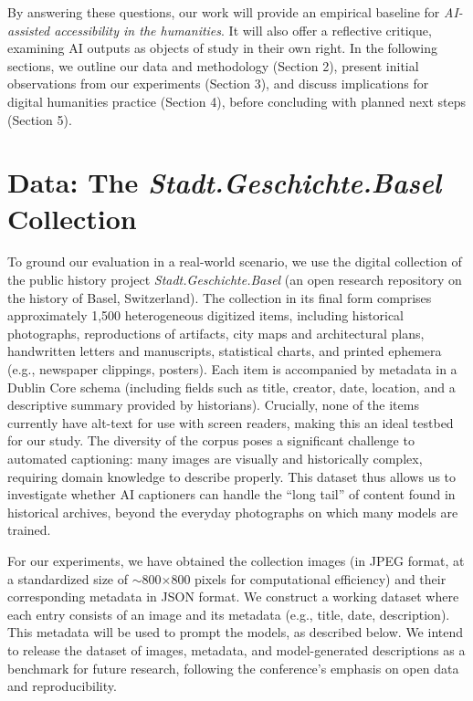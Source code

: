 \documentclass{anthology-ch}         %
\begin{document}
By answering these questions, our work will provide an empirical baseline for \emph{AI-assisted accessibility in the humanities}. It will also offer a reflective critique, examining AI outputs as objects of study in their own right. In the following sections, we outline our data and methodology (Section 2), present initial observations from our experiments (Section 3), and discuss implications for digital humanities practice (Section 4), before concluding with planned next steps (Section 5).

\section{Data: The \textit{Stadt.Geschichte.Basel} Collection}

To ground our evaluation in a real-world scenario, we use the digital collection of the public history project \emph{Stadt.Geschichte.Basel} (an open research repository on the history of Basel, Switzerland). The collection in its final form comprises approximately 1,500 heterogeneous digitized items, including historical photographs, reproductions of artifacts, city maps and architectural plans, handwritten letters and manuscripts, statistical charts, and printed ephemera (e.g., newspaper clippings, posters). Each item is accompanied by metadata in a Dublin Core schema (including fields such as title, creator, date, location, and a descriptive summary provided by historians). Crucially, none of the items currently have alt-text for use with screen readers, making this an ideal testbed for our study. The diversity of the corpus poses a significant challenge to automated captioning: many images are visually and historically complex, requiring domain knowledge to describe properly. This dataset thus allows us to investigate whether AI captioners can handle the ``long tail'' of content found in historical archives, beyond the everyday photographs on which many models are trained.

For our experiments, we have obtained the collection images (in JPEG format, at a standardized size of $\sim$800$\times$800 pixels for computational efficiency) and their corresponding metadata in JSON format. We construct a working dataset where each entry consists of an image and its metadata (e.g., title, date, description). This metadata will be used to prompt the models, as described below. We intend to release the dataset of images, metadata, and model-generated descriptions as a benchmark for future research, following the conference’s emphasis on open data and reproducibility.
\end{document}

